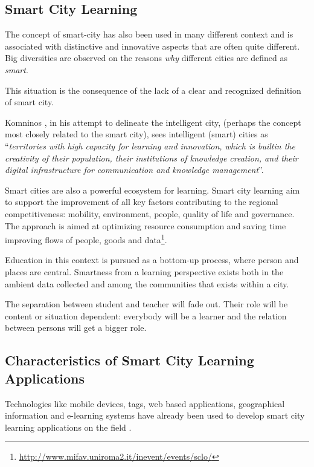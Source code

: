 \subsection{Smart City Learning}
The concept of smart-city has also been used in many different context and is associated with distinctive and innovative aspects that are often quite different. Big diversities are observed on the reasons \textit{why} different cities are defined as \textit{smart}.

This situation is the consequence of the lack of a clear and recognized definition of smart city.

Komninos \cite{komninos_intelligent_2002}, in his attempt to delineate the intelligent city, (perhaps the concept most closely related to the smart city), sees intelligent (smart) cities as ``\textit{territories with high capacity for learning and innovation, which is built\textendash in the creativity of their population, their institutions of knowledge creation, and their digital infrastructure for communication and knowledge management}''.

Smart cities are also a powerful ecosystem for learning. Smart city learning aim to support the improvement of all key factors contributing to the regional competitiveness: mobility, environment, people, quality of life and governance. The approach is aimed at optimizing resource consumption and saving time improving flows of people, goods and data\footnote{\url{http://www.mifav.uniroma2.it/inevent/events/sclo/}}.

Education in this context is pursued as a bottom-up process, where person and places are central. Smartness from a learning perspective exists both in the ambient data collected and among the communities that exists within a city.

The separation between student and teacher will fade out. Their role will be content or situation dependent: everybody will be a learner and the relation between persons will get a bigger role.


\subsection{Characteristics of Smart City Learning Applications}


Technologies like mobile devices, tags, web based applications, geographical information and e-learning systems have already been used to develop smart city learning applications on the field \cite{perez-sanagustin_multichannel_2013} \cite{delfatto_geographic_2013}.

